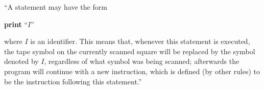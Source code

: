 \documentclass[a4paper]{article}
\begin{document}
``A statement may have the form

\begin{center}
	{\bfseries print} ``$I$''
\end{center}
where $I$ is an identifier. This means that, whenever this statement is
executed, the tape symbol on the currently scanned square will be replaced by
the symbol denoted by $I$, regardless of what symbol was being scanned;
afterwards the program will continue with a new instruction, which is defined
(by other rules) to be the instruction following this statement.''
\end{document}
